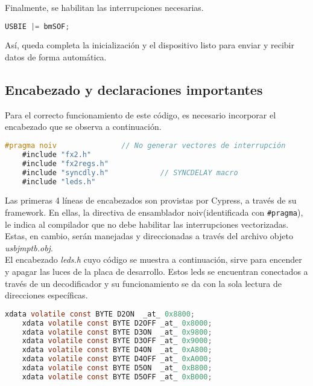 	Finalmente, se habilitan las interrupciones necesarias.
	
%	
	\begin{lstlisting}[language=C,backgroundcolor=\color{gray!30}]
	USBIE |= bmSOF;
	\end{lstlisting}

	Así, queda completa la inicialización y el dispositivo listo para enviar y recibir datos de forma automática.\\
	
\subsection{Encabezado y declaraciones importantes}
	Para el correcto funcionamiento de este código, es necesario incorporar el encabezado que se observa a continuación.
	
	\begin{lstlisting}[language=C,backgroundcolor=\color{gray!30}]
	#pragma noiv               // No generar vectores de interrupción
	#include "fx2.h"
	#include "fx2regs.h"
	#include "syncdly.h"            // SYNCDELAY macro
	#include "leds.h"
	\end{lstlisting}
	
	Las primeras 4 líneas de encabezados son provistas por Cypress, a través de su framework. En ellas, la directiva de ensamblador noiv(identificada con \verb|#pragma|), le indica al compilador que no debe habilitar las interrupciones vectorizadas. Estas, en cambio, serán manejadas y direccionadas a través del archivo objeto {\it usbjmptb.obj}.\\
	
	El encabezado {\it leds.h} cuyo código se muestra a continuación, sirve para encender y apagar las luces de la placa de desarrollo. Estos leds se encuentran conectados a través de un decodificador y su funcionamiento se da con la sola lectura de direcciones específicas.
	
	\begin{lstlisting}[language=C,backgroundcolor=\color{gray!30}]
	xdata volatile const BYTE D2ON	_at_ 0x8800;
	xdata volatile const BYTE D2OFF	_at_ 0x8000;
	xdata volatile const BYTE D3ON	_at_ 0x9800;
	xdata volatile const BYTE D3OFF	_at_ 0x9000;
	xdata volatile const BYTE D4ON	_at_ 0xA800;
	xdata volatile const BYTE D4OFF	_at_ 0xA000;
	xdata volatile const BYTE D5ON	_at_ 0xB800;
	xdata volatile const BYTE D5OFF	_at_ 0xB000;	\end{lstlisting}
	
